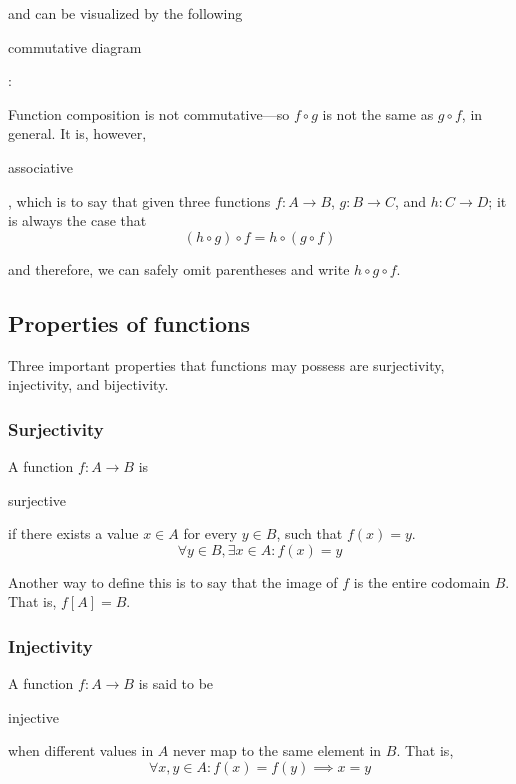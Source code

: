 \documentclass[11pt]{article}
\theoremstyle{plain}
\theoremstyle{definition}
\begin{document}
\noindent and can be visualized by the following \begin{em}commutative diagram\end{em}:

\begin{center}
  \def\svgwidth{0.2\columnwidth}
  
\end{center}

\noindent Function composition is not commutative---so $ f \circ g $ is not the same as $ g \circ f $, in general.
It is, however, \begin{em}associative\end{em}, which is to say that given three functions \mbox{$ f : A \to B $}, \mbox{$ g : B \to C $}, and \mbox{$ h : C \to D $}; it is always the case that
$$
  (h \circ g) \circ f = h \circ (g \circ f)
$$

\noindent and therefore, we can safely omit parentheses and write $ h \circ g \circ f $.

\begin{center}
  \def\svgwidth{0.3\columnwidth}
  
\end{center}

\subsection*{Properties of functions}

Three important properties that functions may possess are surjectivity, injectivity, and bijectivity.

\subsubsection*{ Surjectivity}

A function $ f : A \to B $ is \begin{em}surjective\end{em} if there exists a value $ x \in A $ for every $ y \in B $, such that $ f(x) = y $.
$$
  \forall y \in B, \exists x \in A : f(x) = y
$$

\noindent Another way to define this is to say that the image of $ f $ is the entire codomain $ B $. That is, $ f[A] = B $.

\subsubsection*{ Injectivity}

A function $ f : A \to B $ is said to be \begin{em}injective\end{em} when different values in $ A $ never map to the same element in $ B $. That is,
$$
  \forall x, y \in A : f(x) = f(y) \implies x = y
$$
\end{document}
